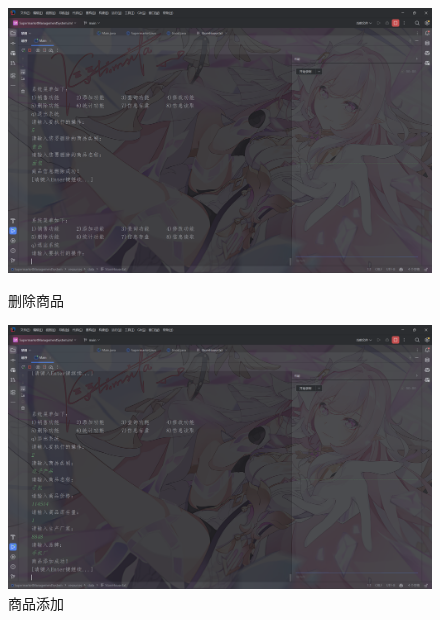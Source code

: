 \documentclass[12pt, a4paper, oneside]{ctexart}
\begin{document}
\begin{figure}[H]
    \begin{minipage}[t]{0.48\textwidth}
        \includegraphics[width=\textwidth]{images/删除商品.png}
        \caption*{删除商品}
    \end{minipage}
    \hfill
    \begin{minipage}[t]{0.48\textwidth}
        \includegraphics[width=\textwidth]{images/商品添加.png}
        \caption*{商品添加}
    \end{minipage}
\end{figure}
\end{document}
